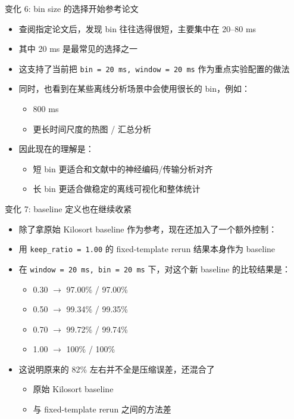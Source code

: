 \documentclass[aspectratio=169,11pt]{beamer}
\begin{document}
\begin{frame}{变化 6: bin size 的选择开始参考论文}
  \small
  \begin{itemize}
    \item 查阅指定论文后，发现 bin 往往选得很短，主要集中在 \alert{20--80 ms}
    \item 其中 \alert{20 ms} 是最常见的选择之一
    \item 这支持了当前把 \texttt{bin = 20 ms, window = 20 ms} 作为重点实验配置的做法
    \item 同时，也看到在某些离线分析场景中会使用很长的 bin，例如：
    \begin{itemize}
      \item 800 ms
      \item 更长时间尺度的热图 / 汇总分析
    \end{itemize}
    \item 因此现在的理解是：
    \begin{itemize}
      \item 短 bin 更适合和文献中的神经编码/传输分析对齐
      \item 长 bin 更适合做稳定的离线可视化和整体统计
    \end{itemize}
  \end{itemize}
\end{frame}

\begin{frame}{变化 7: baseline 定义也在继续收紧}
  \small
  \begin{itemize}
    \item 除了拿原始 Kilosort baseline 作为参考，现在还加入了一个额外控制：
    \item 用 \texttt{keep\_ratio = 1.00} 的 fixed-template rerun 结果本身作为 baseline
    \item 在 \texttt{window = 20 ms, bin = 20 ms} 下，对这个新 baseline 的比较结果是：
    \begin{itemize}
      \item 0.30 $\rightarrow$ 97.00\% / 97.00\%
      \item 0.50 $\rightarrow$ 99.34\% / 99.35\%
      \item 0.70 $\rightarrow$ 99.72\% / 99.74\%
      \item 1.00 $\rightarrow$ 100\% / 100\%
    \end{itemize}
    \item 这说明原来的 82\% 左右并不全是压缩误差，还混合了
    \begin{itemize}
      \item 原始 Kilosort baseline
      \item 与 fixed-template rerun 之间的方法差
    \end{itemize}
  \end{itemize}
\end{frame}
\end{document}
